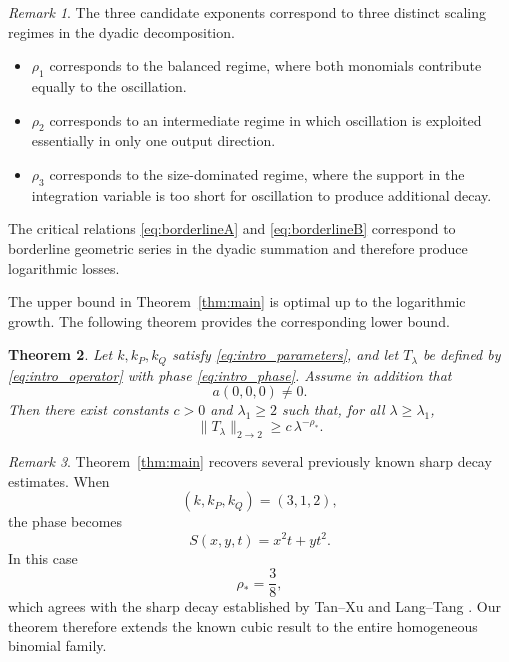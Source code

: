 \documentclass[10pt]{amsart}
\numberwithin{equation}{section}
\newtheorem{theorem}{Theorem}[section]
\theoremstyle{definition}
\theoremstyle{remark}
\newtheorem{remark}[theorem]{Remark}
\theoremstyle{remark}
\begin{document}
 

    \begin{remark}

    The three candidate exponents correspond to three distinct scaling regimes in
    the dyadic decomposition.
    \begin{itemize}
    \item
    $\rho_1$ corresponds to the balanced regime, where both monomials contribute
    equally to the oscillation.
    
    \item
    $\rho_2$ corresponds to an intermediate regime in which oscillation is exploited
    essentially in only one output direction.
    
    \item
    $\rho_3$ corresponds to the size-dominated regime, where the support in the
    integration variable is too short for oscillation to produce additional decay.
    
    \end{itemize}
    The critical relations \eqref{eq:borderlineA} and \eqref{eq:borderlineB} correspond to borderline geometric
    series in the dyadic summation and therefore produce logarithmic losses.
    \end{remark}

    


    The upper bound in Theorem~\ref{thm:main} is optimal up to the logarithmic growth.
    The following theorem provides the corresponding lower bound.
	
	\begin{theorem}\label{thm:lbound}
		Let \(k,k_P,k_Q\) satisfy \eqref{eq:intro_parameters}, and let \(T_\lambda\) be defined by
		\eqref{eq:intro_operator} with phase \eqref{eq:intro_phase}.  Assume in addition that
		\begin{equation*}
			a(0,0,0)\neq 0.
		\end{equation*}
		Then there exist constants \(c>0\) and \(\lambda_1\ge2\) such that, for all \(\lambda\ge\lambda_1\),
		\begin{equation}\label{eq:lowerbound_main}
			\|T_\lambda\|_{2\to2}
			\ge c\,\lambda^{-\rho_*}.
		\end{equation}
	\end{theorem}


	
	\begin{remark}
    Theorem~\ref{thm:main} recovers several previously known sharp decay estimates.
    When
    \[
    (k,k_P,k_Q)=(3,1,2),
    \]
    the phase becomes
    \[
    S(x,y,t)=x^2t+yt^2.
    \]
    In this case
    \[
    \rho_*=\frac38,
    \]
    which agrees with the sharp decay established by
    Tan--Xu \cite{TX24} and Lang--Tang \cite{LT25}.
    Our theorem therefore extends the known cubic result to the entire homogeneous
    binomial family.
	\end{remark}
\end{document}
